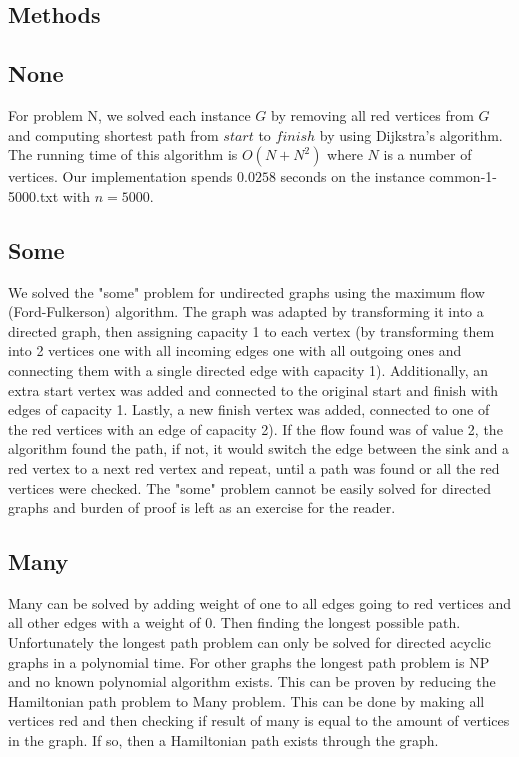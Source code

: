 \documentclass{tufte-handout}
\begin{document}
\subsection{Methods}

\subsection{None}

For problem N, we solved each instance $G$ by removing all red vertices from $G$ and computing shortest path from $start$ to $finish$  by using Dijkstra's algorithm. 
The running time of this algorithm is $O(N + N^2)$ where $N$ is a number of vertices. Our implementation spends $0.0258$ seconds on the instance common-1-5000.txt with $n=5000$.

\subsection{Some}

We solved the "some" problem for undirected graphs using the maximum flow (Ford-Fulkerson) algorithm. The graph was adapted by transforming it into a directed graph, then assigning capacity 1 to each vertex (by transforming them into 2 vertices one with all incoming edges one with all outgoing ones and connecting them with a single directed edge with capacity 1). Additionally, an extra start vertex was added and connected to the original start and finish with edges of capacity 1. Lastly, a new finish vertex was added, connected to one of the red vertices with an edge of capacity 2). If the flow found was of value 2, the algorithm found the path, if not, it would switch the edge between the sink and a red vertex to a next red vertex and repeat, until a path was found or all the red vertices were checked.
The "some" problem cannot be easily solved for directed graphs and burden of proof is left as an exercise for the reader.

\subsection{Many}

Many can be solved by adding weight of one to all edges going to red vertices and all other edges with a weight of 0. Then finding the longest possible path. Unfortunately the longest path problem can only be solved for directed acyclic graphs in a polynomial time. For other graphs the longest path problem is NP and no known polynomial algorithm exists. This can be proven by reducing the Hamiltonian path problem to Many problem. This can be done by making all vertices red and then checking if result of many is equal to the amount of vertices in the graph. If so, then a Hamiltonian path exists through the graph.
\end{document}
